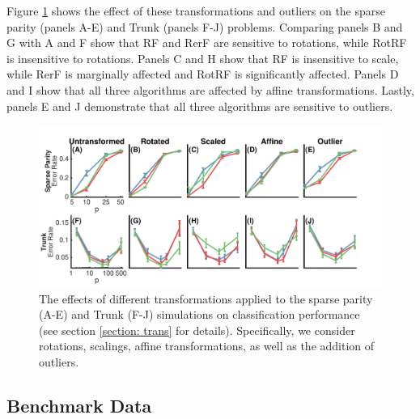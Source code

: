 \documentclass{article}
\begin{document}
Figure \ref{transformations} shows the effect of these transformations and outliers on the sparse parity (panels A-E) and Trunk (panels F-J) problems. Comparing panels B and G with A and F show that RF and RerF are sensitive to rotations, while RotRF is insensitive to rotations. Panels C and H show that RF is insensitive to scale, while RerF is marginally affected and RotRF is significantly affected. Panels D and I show that all three algorithms are affected by affine transformations. Lastly, panels E and J demonstrate that all three algorithms are sensitive to outliers.

\begin{figure}[ht]
\vskip 0.2in
\begin{center}
\centerline{\includegraphics[width=\columnwidth]{../Figures/pdf/Fig3_transformations2}}
\caption{The effects of different transformations applied to the sparse parity (A-E) and Trunk (F-J) simulations on classification performance (see section \ref{section: trans} for details). Specifically, we consider rotations, scalings, affine transformations, as well as the addition of outliers.}
\label{transformations}
\end{center}
\vskip -0.2in
\end{figure}

\subsection{Benchmark Data}
\label{section: benchmark}
\end{document}
